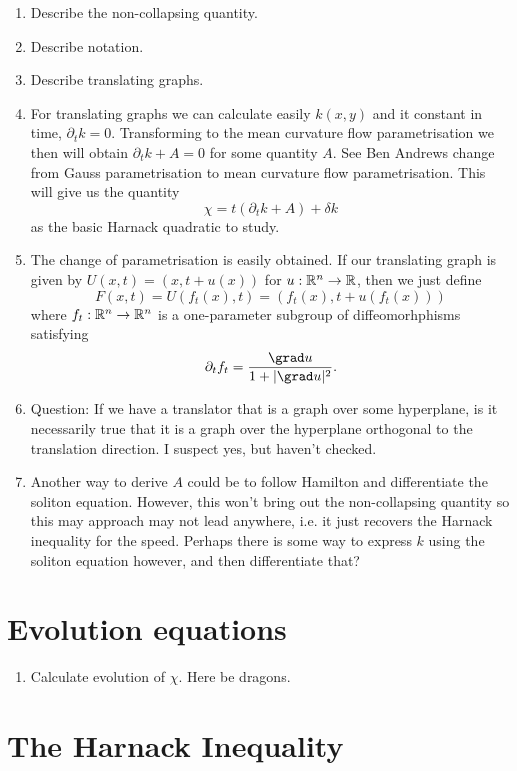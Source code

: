 \documentclass{amsart}
\begin{document}
\begin{enumerate}
\item Describe the non-collapsing quantity.
\item Describe notation.
\item Describe translating graphs.
\item For translating graphs we can calculate easily $k(x,y)$ and it constant in time, $\partial_t k = 0$. Transforming to the mean curvature flow parametrisation we then will obtain $\partial_t k + A = 0$ for some quantity $A$. See Ben Andrews change from Gauss parametrisation to mean curvature flow parametrisation. This will give us the quantity
\[
\chi = t(\partial_t k + A) + \delta k
\]
as the basic Harnack quadratic to study.
\item The change of parametrisation is easily obtained. If our translating graph is given by $U(x,t) = (x,t + u(x))$ for $u : \mathbb{R}^n \to \mathbb{R}$, then we just define
\[
F(x,t) = U(f_t(x), t) = (f_t(x), t + u(f_t(x)))
\]
where $f_t : \mathbb{R}^n \to \mathbb{R}^n$ is a one-parameter subgroup of diffeomorhphisms satisfying
\[
\partial_t f_t = \frac{\grad u}{1 + |\grad u|^2}.
\]
\item Question: If we have a translator that is a graph over some hyperplane, is it necessarily true that it is a graph over the hyperplane orthogonal to the translation direction. I suspect yes, but haven't checked.
\item Another way to derive $A$ could be to follow Hamilton and differentiate the soliton equation. However, this won't bring out the non-collapsing quantity so this may approach may not lead anywhere, i.e. it just recovers the Harnack inequality for the speed. Perhaps there is some way to express $k$ using the soliton equation however, and then differentiate that?
\end{enumerate}

\section{Evolution equations}

\begin{enumerate}
\item Calculate evolution of $\chi$. Here be dragons.
\end{enumerate}

\section{The Harnack Inequality}
\end{document}
